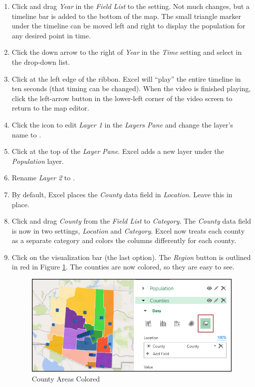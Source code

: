 \begin{enumbox}
\begin{enumerate}
		\item Click and drag \textit{Year} in the \textit{Field List} to the  setting. Not much changes, but a timeline bar is added to the bottom of the map. The small triangle marker under the timeline can be moved left and right to display the population for any desired point in time.
		\item Click the down arrow to the right of \textit{Year} in the \textit{Time} setting and select  in the drop-down list.
		\item Click  at the left edge of the ribbon. Excel will ``play'' the entire timeline in ten seconds (that timing can be changed). When the video is finished playing, click the left-arrow button in the lower-left corner of the video screen to return to the map editor.
		\item Click the  icon to edit \textit{Layer 1} in the \textit{Layers Pane} and change the layer's name to .
	
		\item Click  at the top of the \textit{Layer Pane}. Excel adds a new layer under the \textit{Population} layer.
		\item Rename \textit{Layer 2} to .
		\item By default, Excel places the \textit{County} data field in \textit{Location}. Leave this in place.
		\item Click and drag \textit{County} from the \textit{Field List} to \textit{Category}. The \textit{County} data field is now in two settings, \textit{Location} and \textit{Category}. Excel now treats each county as a separate category and colors the columns differently for each county.
		\item Click  on the visualization bar (the last option). The \textit{Region} button is outlined in red in Figure \ref{08:fig28}. The counties are now colored, so they are easy to see. 

		\begin{figure}[H]
			\centering
			\includegraphics[width=\maxwidth{.85\linewidth}]{gfx/ch08_fig28}
			\caption{County Areas Colored}
			\label{08:fig28}
		\end{figure}


\end{enumerate}
\end{enumbox}
